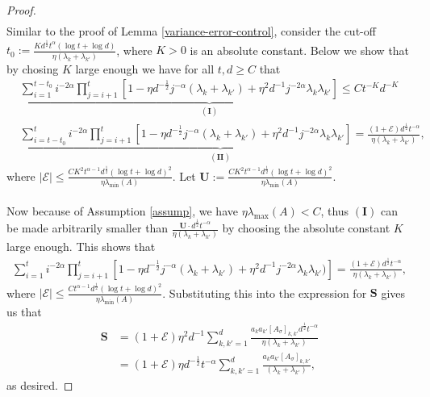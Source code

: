 \documentclass[10pt,a4paper]{amsart}
\begin{document}
\begin{proof}
\begin{align*}
\end{align*}
Similar to the proof of Lemma \ref{variance-error-control}, consider the cut-off $t_0 := \frac{Kd^{\frac{1}{2}}t^{\alpha} (\log t + \log d)}{\eta (\lambda_k + \lambda_{k'})}$, where $K > 0$ is an absolute constant. Below we show that by chosing $K$ large enough we have for all $t,d \geq C$ that
\begin{align*}
    &\underbrace{\sum_{i = 1}^{t-t_0} i^{-2\alpha}\prod_{j=i+1}^t[1 - \eta d^{-\frac{1}{2}} j^{-\alpha} (\lambda_k + \lambda_{k'}) + \eta^2 d^{-1} j^{-2\alpha} \lambda_{k} \lambda_{k'}] \leq Ct^{-K}d^{-K}}_{(\mathbf{I})}
    \\
    &\underbrace{\sum_{i = t-t_0}^{t} i^{-2\alpha}\prod_{j=i+1}^t[1 - \eta d^{-\frac{1}{2}} j^{-\alpha} (\lambda_k + \lambda_{k'}) + \eta^2 d^{-1} j^{-2\alpha} \lambda_{k} \lambda_{k'}] = \frac{(1 + \mathcal E)d^{\frac{1}{2}}t^{-\alpha}}{\eta (\lambda_k + \lambda_{k'})}}_{(\mathbf{II})},
\end{align*}
where $|\mathcal E| \leq \frac{CK^2 t^{\alpha - 1}d^{\frac{1}{2}}(\log t + \log d)^2}{\eta \lambda_{\min}(A)}$.  Let $\mathbf{U} := \frac{CK^2 t^{\alpha - 1}d^{\frac{1}{2}}(\log t + \log d)^2}{\eta \lambda_{\min}(A)}$.
\\\\
Now because of Assumption \ref{assump}, we have $\eta \lambda_{\max}(A) <  C$, thus $(\mathbf{I})$ can be made arbitrarily smaller than $\frac{\mathbf{U}\cdot d^{\frac{1}{2}}t^{-\alpha}}{\eta (\lambda_k + \lambda_{k'})}$ by choosing the absolute constant $K$ large enough. This shows that
\begin{align*}
\sum_{i = 1}^t i^{-2\alpha} \prod_{j = i+1}^t [1 - \eta d^{-\frac{1}{2}}j^{-\alpha}(\lambda_k + \lambda_{k'}) + \eta^2 d^{-1} j^{-2\alpha} \lambda_k \lambda_{k'})] = \frac{(1 + \mathcal E)d^{\frac{1}{2}}t^{-\alpha}}{\eta (\lambda_k + \lambda_{k'})},
\end{align*}
where $|\mathcal E| \leq \frac{Ct^{\alpha - 1}d^{\frac{1}{2}}(\log t + \log d)^2}{\eta \lambda_{\min}(A)}$. Substituting this into the expression for $\mathbf{S}$ gives us that
\begin{align*}
\mathbf{S} &= (1 + \mathcal E)\eta^2 d^{-1} \sum_{k,k' = 1}^d \frac{a_k a_{k'} [A_{\sigma}]_{k,k'}d^{\frac{1}{2}}t^{-\alpha}}{\eta (\lambda_k + \lambda_{k'})}
\\
&= (1 + \mathcal E)\eta d^{-\frac{1}{2}}t^{-\alpha}\sum_{k,k' = 1}^d \frac{a_{k}a_{k'}[A_{\sigma}]_{k,k'}}{(\lambda_k + \lambda_{k'})},
\end{align*}
as desired.

\end{proof}
\end{document}
